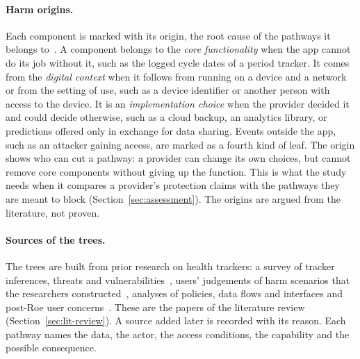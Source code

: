 \paragraph{Harm origins.} Each component is marked with its origin, the root
cause of the pathways it belongs
to~\parencite[\S4.1]{knabenhans2026harms}. A component belongs to the
\emph{core functionality} when the app cannot do its job without it, such as
the logged cycle dates of a period tracker. It comes from the \emph{digital
context} when it follows from running on a device and a network or from the
setting of use, such as a device identifier or another person with access to
the device. It is an \emph{implementation choice} when the provider decided it
and could decide otherwise, such as a cloud backup, an analytics library, or
predictions offered only in exchange for data sharing. Events outside the app, such as an
attacker gaining access, are marked as a fourth kind of leaf. The origin shows who
can cut a pathway: a provider can change its own choices, but cannot remove
core components without giving up the function. This is what the study needs
when it compares a provider's protection claims with the pathways they are
meant to block (Section~\ref{sec:assessment}). The origins are argued from the
literature, not proven.

\paragraph{Sources of the trees.} The trees are built from prior research on
health trackers: a survey of tracker inferences, threats and
vulnerabilities~\parencite{niksirat2024wearable}, users' judgements of harm scenarios
that the researchers constructed~\parencite{gabriele2020understanding}, analyses of policies, data
flows and interfaces
\parencite{shipp2020period,malki2024exploring,hudig2025intimate} and post-Roe
user concerns~\parencite{cao2024deleted}. These are the papers of the literature review
(Section~\ref{sec:lit-review}). A source added later is recorded with its reason. Each pathway names the
data, the actor, the access conditions, the capability and the possible
consequence.

